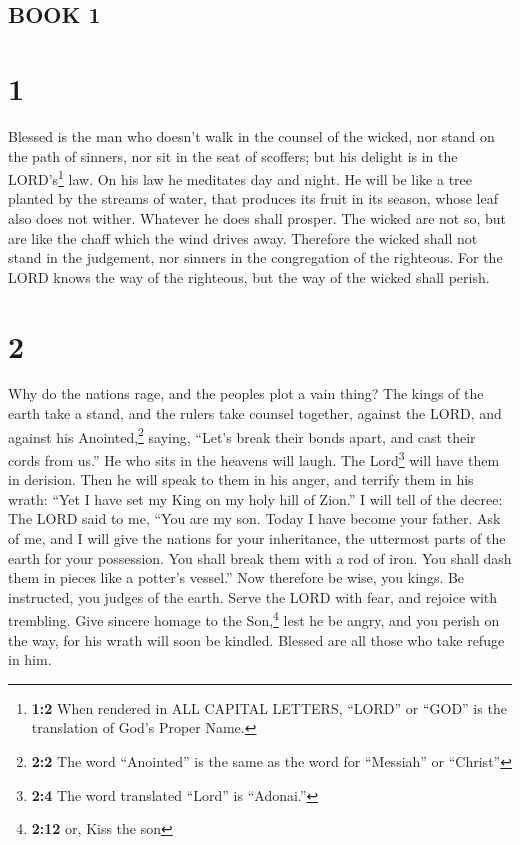 \hypertarget{book-1}{%
\subsection{BOOK 1}\label{book-1}}

\hypertarget{section}{%
\section{1}\label{section}}

 Blessed is the man who doesn't walk in the counsel of the
wicked, nor stand on the path of sinners, nor sit in the seat of
scoffers;  but his delight is in the LORD's\footnote{\textbf{1:2}
  When rendered in ALL CAPITAL LETTERS, ``LORD'' or ``GOD'' is the
  translation of God's Proper Name.} law. On his law he meditates day
and night.  He will be like a tree planted by the streams
of water, that produces its fruit in its season, whose leaf also does
not wither. Whatever he does shall prosper.  The wicked
are not so, but are like the chaff which the wind drives away.
 Therefore the wicked shall not stand in the judgement,
nor sinners in the congregation of the righteous.  For the
LORD knows the way of the righteous, but the way of the wicked shall
perish.

\hypertarget{section-1}{%
\section{2}\label{section-1}}

 Why do the nations rage, and the peoples plot a vain
thing?  The kings of the earth take a stand, and the
rulers take counsel together, against the LORD, and against his
Anointed,\footnote{\textbf{2:2} The word ``Anointed'' is the same as the
  word for ``Messiah'' or ``Christ''} saying,  ``Let's
break their bonds apart, and cast their cords from us.'' 
He who sits in the heavens will laugh. The Lord\footnote{\textbf{2:4}
  The word translated ``Lord'' is ``Adonai.''} will have them in
derision.  Then he will speak to them in his anger, and
terrify them in his wrath:  ``Yet I have set my King on my
holy hill of Zion.''  I will tell of the decree: The LORD
said to me, ``You are my son. Today I have become your father.
 Ask of me, and I will give the nations for your
inheritance, the uttermost parts of the earth for your possession.
 You shall break them with a rod of iron. You shall dash
them in pieces like a potter's vessel.''  Now therefore
be wise, you kings. Be instructed, you judges of the earth.
 Serve the LORD with fear, and rejoice with trembling.
 Give sincere homage to the Son,\footnote{\textbf{2:12}
  or, Kiss the son} lest he be angry, and you perish on the way, for his
wrath will soon be kindled. Blessed are all those who take refuge in
him.

